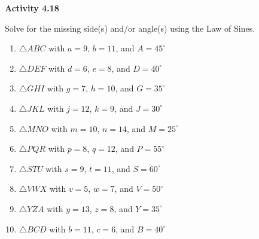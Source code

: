 \vspace{0.3ex}
\noindent\textbf{Activity 4.18}

\vspace{0.2ex}

Solve for the missing side(s) and/or angle(s) using the Law of Sines.

\begin{enumerate}
    \item \(\triangle ABC\) with \(a = 9\), \(b = 11\), and \(A = 45^\circ\)
    \item \(\triangle DEF\) with \(d = 6\), \(e = 8\), and \(D = 40^\circ\)
    \item \(\triangle GHI\) with \(g = 7\), \(h = 10\), and \(G = 35^\circ\)
    \item \(\triangle JKL\) with \(j = 12\), \(k = 9\), and \(J = 30^\circ\)
    \item \(\triangle MNO\) with \(m = 10\), \(n = 14\), and \(M = 25^\circ\)
    \item \(\triangle PQR\) with \(p = 8\), \(q = 12\), and \(P = 55^\circ\)
    \item \(\triangle STU\) with \(s = 9\), \(t = 11\), and \(S = 60^\circ\)
    \item \(\triangle VWX\) with \(v = 5\), \(w = 7\), and \(V = 50^\circ\)
    \item \(\triangle YZA\) with \(y = 13\), \(z = 8\), and \(Y = 35^\circ\)
    \item \(\triangle BCD\) with \(b = 11\), \(c = 6\), and \(B = 40^\circ\)
\end{enumerate}
